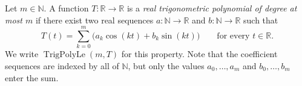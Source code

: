 \begin{definition}
Let $m\in\mathbb{N}$. A function $T:\mathbb{R}\to\mathbb{R}$ is a \emph{real
trigonometric polynomial of degree at most $m$} if there exist two real
sequences $a:\mathbb{N}\to\mathbb{R}$ and $b:\mathbb{N}\to\mathbb{R}$ such that
\[
  T(t)=\sum_{k=0}^{m}\bigl(a_k\cos(kt)+b_k\sin(kt)\bigr)
  \qquad\text{for every }t\in\mathbb{R}.
\]
We write $\operatorname{TrigPolyLe}(m,T)$ for this property. Note that the
coefficient sequences are indexed by all of $\mathbb{N}$, but only the values
$a_0,\dots,a_m$ and $b_0,\dots,b_m$ enter the sum.
\end{definition}
